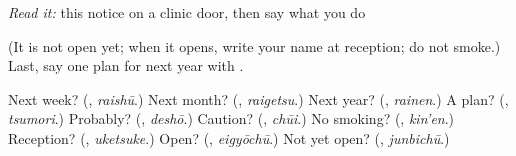 \emph{Read it:} this notice on a clinic door, then say what you do

\begin{quote}
\textbf{}
\end{quote}

\begin{quote}
\textbf{   }
\end{quote}

\begin{quote}
\textbf{}
\end{quote}

(It is not open yet; when it opens, write your name at reception; do not smoke.) Last, say one plan for next year with \textbf{}.

\begin{tcolorbox}[breakable,colback=teal!4,colframe=teal!35!black,title={Before you move on}]
Next week? (\textbf{}, \emph{raishū}.) Next month? (\textbf{}, \emph{raigetsu}.) Next year? (\textbf{}, \emph{rainen}.) A plan? (\textbf{}, \emph{tsumori}.) Probably? (\textbf{}, \emph{deshō}.) Caution? (\textbf{}, \emph{chūi}.) No smoking? (\textbf{}, \emph{kin'en}.) Reception? (\textbf{}, \emph{uketsuke}.) Open? (\textbf{}, \emph{eigyōchū}.) Not yet open? (\textbf{}, \emph{junbichū}.)
\end{tcolorbox}
